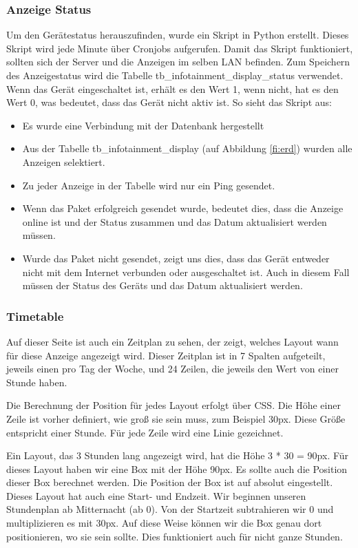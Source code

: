 \subsubsection{Anzeige Status}
Um den Gerätestatus herauszufinden, wurde ein Skript in Python erstellt. Dieses Skript wird jede Minute über Cronjobs aufgerufen. Damit das Skript funktioniert, sollten sich der Server und die Anzeigen im selben LAN befinden. Zum Speichern des Anzeigestatus wird die Tabelle tb\_infotainment\_display\_status verwendet. Wenn das Gerät eingeschaltet ist, erhält es den Wert 1, wenn nicht, hat es den Wert 0, was bedeutet, dass das Gerät nicht aktiv ist. So sieht das Skript aus:
\begin{itemize}
	\item Es wurde eine Verbindung mit der Datenbank hergestellt
	\item Aus der Tabelle tb\_infotainment\_display (auf Abbildung \ref{fi:erd}) wurden alle Anzeigen selektiert.
	\item Zu jeder Anzeige in der Tabelle wird nur ein Ping gesendet.
	\item Wenn das Paket erfolgreich gesendet wurde, bedeutet dies, dass die Anzeige online ist und der Status zusammen und das Datum aktualisiert werden müssen. 
	\item Wurde das Paket nicht gesendet, zeigt uns dies, dass das Gerät entweder nicht mit dem Internet verbunden oder ausgeschaltet ist. Auch in diesem Fall müssen der Status des Geräts und das Datum aktualisiert werden.
\end{itemize}


\subsubsection{Timetable}
\label{sub:timetable}
Auf dieser Seite ist auch ein Zeitplan zu sehen, der zeigt, welches Layout wann für diese Anzeige angezeigt wird. Dieser Zeitplan ist in 7 Spalten aufgeteilt, jeweils einen pro Tag der Woche, und 24 Zeilen, die jeweils den Wert von einer Stunde haben.

Die Berechnung der Position für jedes Layout erfolgt über CSS. Die Höhe einer Zeile ist vorher definiert, wie groß sie sein muss, zum Beispiel 30px. Diese Größe entspricht einer Stunde. Für jede Zeile wird eine Linie gezeichnet. 

Ein Layout, das 3 Stunden lang angezeigt wird, hat die Höhe 3 * 30 = 90px. Für dieses Layout haben wir eine Box mit der Höhe 90px. Es sollte auch die Position dieser Box berechnet werden. Die Position der Box ist auf absolut eingestellt. Dieses Layout hat auch eine Start- und Endzeit. Wir beginnen unseren Stundenplan ab Mitternacht (ab 0). Von der Startzeit subtrahieren wir 0 und multiplizieren es mit 30px. Auf diese Weise können wir die Box genau dort positionieren, wo sie sein sollte. Dies funktioniert auch für nicht ganze Stunden.

